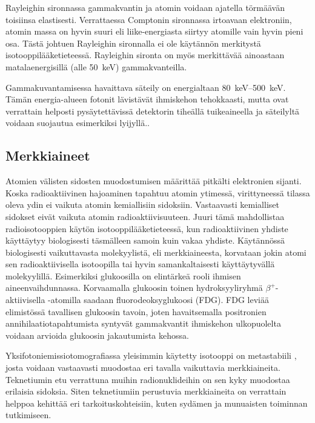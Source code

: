 Rayleighin sironnassa gammakvantin ja atomin voidaan ajatella törmäävän toisiinsa elastisesti. Verrattaessa Comptonin sironnassa irtoavaan elektroniin, atomin massa on hyvin suuri eli liike-energiasta siirtyy atomille vain hyvin pieni osa. Tästä johtuen Rayleighin sironnalla ei ole käytännön merkitystä isotooppilääketieteessä. Rayleighin sironta on myös merkittävää ainoastaan matalaenergisillä (alle \qty{50}{\kilo\electronvolt}) gammakvanteilla.\cite{cherry_interaction_2012}

Gammakuvantamisessa havaittava säteily on energialtaan \qtyrange{80}{500}{\kilo\electronvolt}. Tämän energia-alueen fotonit lävistävät ihmiskehon tehokkaasti, mutta ovat verrattain helposti pysäytettävissä detektorin tiheällä tuikeaineella ja säteilyltä voidaan suojautua esimerkiksi lyijyllä.\cite{cherry_gamma_2012}.

\subsection{Merkkiaineet}
Atomien välisten sidosten muodostumisen määrittää pitkälti elektronien sijanti. Koska radioaktiivinen hajoaminen tapahtuu atomin ytimessä, virittyneessä tilassa oleva ydin ei vaikuta atomin kemiallisiin sidoksiin. Vastaavasti kemialliset sidokset eivät vaikuta atomin radioaktiivisuuteen.\cite{cherry_modes_2012} Juuri tämä mahdollistaa radioisotooppien käytön isotooppilääketieteessä, kun radioaktiivinen yhdiste käyttäytyy biologisesti täsmälleen samoin kuin vakaa yhdiste. Käytännössä biologisesti vaikuttavasta molekyylistä, eli merkkiaineesta, korvataan jokin atomi sen radioaktiivisella isotoopilla tai hyvin samankaltaisesti käyttäytyvällä molekyylillä\cite{cherry_modes_2012, crisan_radiopharmaceuticals_2022}. Esimerkiksi glukoosilla on elintärkeä rooli ihmisen aineenvaihdunnassa. Korvaamalla glukoosin toinen hydroksyyliryhmä $\beta^{+}$-aktiivisella -atomilla saadaan fluorodeoksyglukoosi (FDG). FDG leviää elimistössä tavallisen glukoosin tavoin, joten havaitsemalla positronien annihilaatiotapahtumista syntyvät gammakvantit ihmiskehon ulkopuolelta voidaan arvioida glukoosin jakautumista kehossa.\cite{crisan_radiopharmaceuticals_2022}

Yksifotoniemissiotomografiassa yleisimmin käytetty isotooppi on metastabiili , josta voidaan vastaavasti muodostaa eri tavalla vaikuttavia merkkiaineita. Teknetiumin etu verrattuna muihin radionuklideihin on sen kyky muodostaa erilaisia sidoksia. Siten teknetiumiin perustuvia merkkiaineita on verrattain helppoa kehittää eri tarkoituskohteisiin, kuten sydämen ja munuaisten toiminnan tutkimiseen.\cite{crisan_radiopharmaceuticals_2022}

